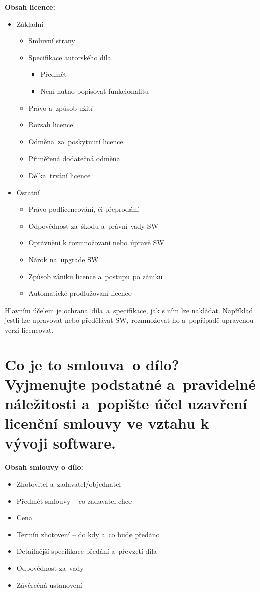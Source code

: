 \noindent\textbf{Obsah licence:}
\begin{itemize}[noitemsep]
    \item Základní
    \begin{itemize}[noitemsep]
        \item Smluvní strany
        \item Specifikace autorského díla
        \begin{itemize}[noitemsep]
            \item Předmět
            \item Není nutno popisovat funkcionalitu
        \end{itemize}
        \item Právo a~způsob užití
        \item Rozsah licence
        \item Odměna~za~poskytnutí licence
        \item Přiměřená dodatečná odměna
        \item Délka~trvání licence
    \end{itemize}
    \item Ostatní
    \begin{itemize}[noitemsep]
        \item Právo podlicencování, či přeprodání
        \item Odpovědnost za~škodu a~právní vady SW
        \item Oprávnění k rozmnožovaní nebo úpravě SW
        \item Nárok na~upgrade SW
        \item Způsob zániku licence a~postupu po zániku
        \item Automatické prodlužovaní licence
    \end{itemize}
\end{itemize}

Hlavním účelem je ochrana~díla~a~specifikace, jak s ním lze nakládat. Například jestli lze upravovat nebo předělávat SW, rozmnožovat ho a~popřípadě upravenou verzi licencovat. 


\section{Co je to smlouva~o dílo? Vyjmenujte podstatné a~pravidelné náležitosti a~popište účel uzavření licenční smlouvy ve vztahu k vývoji software.}

\textbf{Obsah smlouvy o dílo:}
\begin{itemize}[noitemsep]
    \item Zhotovitel a~zadavatel/objednatel
    \item Předmět smlouvy -- co zadavatel chce
    \item Cena
    \item Termín zhotovení -- do kdy a~co bude předáno
    \item Detailnější specifikace předání a~převzetí díla
    \item Odpovědnost za~vady
    \item Závěrečná ustanovení
\end{itemize}


